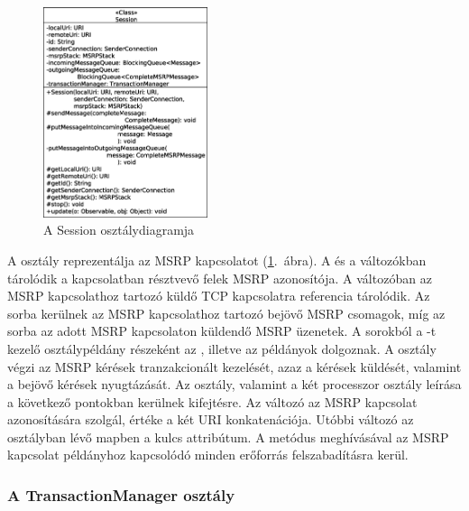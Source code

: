 \begin{figure}
  \vspace{-15pt}
  \begin{center}
    \includegraphics[width=0.43\textwidth]{img/class_diagrams/Session.eps}
  \end{center}
  \vspace{-15pt}
  \captionsetup{font=scriptsize}
  \caption{A Session osztálydiagramja}
   \label{fig:class_session}
  \vspace{-10pt}
\end{figure}
A  osztály reprezentálja az MSRP kapcsolatot (\ref{fig:class_session}.~ábra). A  és a  változókban tárolódik a kapcsolatban résztvevő felek MSRP azonosítója. A  változóban az MSRP kapcsolathoz tartozó küldő TCP kapcsolatra referencia tárolódik. Az  sorba kerülnek az MSRP kapcsolathoz tartozó bejövő MSRP csomagok, míg az  sorba az adott MSRP kapcsolaton küldendő MSRP üzenetek. A sorokból a -t kezelő  osztálypéldány részeként az , illetve az  példányok dolgoznak. A  osztály végzi az MSRP kérések tranzakcionált kezelését, azaz a kérések küldését, valamint a bejövő kérések nyugtázását. Az osztály, valamint a két processzor osztály leírása a következő pontokban kerülnek kifejtésre. Az  változó az MSRP kapcsolat azonosítására szolgál, értéke a két URI konkatenációja. Utóbbi változó az  osztályban lévő  mapben a kulcs attribútum. A  metódus meghívásával az MSRP kapcsolat példányhoz kapcsolódó minden erőforrás felszabadításra kerül. 

\subsubsection*{A TransactionManager osztály}
\label{sec:msrp_transactionmanager}

